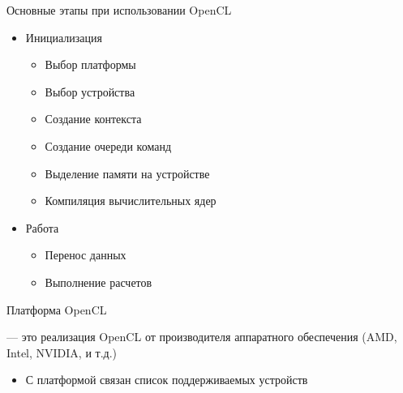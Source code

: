 \documentclass[@BEAMER_OPTIONS@]{beamer}
\begin{document}
\begin{frame}{Основные этапы при использовании OpenCL}
    \begin{itemize}
        \item Инициализация
            \begin{itemize}
                \item Выбор платформы
                \item Выбор устройства
                \item Создание контекста
                \item Создание очереди команд
                \item Выделение памяти на устройстве
                \item Компиляция вычислительных ядер
            \end{itemize}
        \item Работа
            \begin{itemize}
                \item Перенос данных
                \item Выполнение расчетов
            \end{itemize}
    \end{itemize}
\end{frame}

\begin{frame}[fragile]{Платформа OpenCL}
    \begin{description}[\;\;]
        \item[Платформа] --- это реализация OpenCL от производителя
            аппаратного обеспечения (AMD, Intel, NVIDIA, и т.д.)
            \vspace{\baselineskip}
            \begin{itemize}
                \item С платформой связан список поддерживаемых устройств
            \end{itemize}
    \end{description}
\end{frame}
\end{document}
